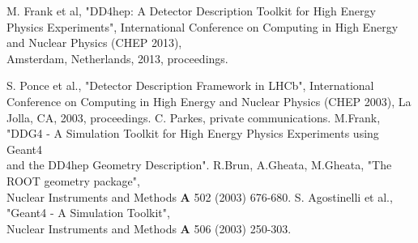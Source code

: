 \documentclass[10pt,a4paper]{article}
\begin{document}
\newpage
\begin{thebibliography}{9}
 M. Frank et al, "DD4hep: A Detector Description Toolkit 
                for High Energy Physics Experiments",
                International Conference on Computing in High Energy and Nuclear Physics  
                (CHEP 2013), \\
                Amsterdam, Netherlands, 2013, proceedings.

 S. Ponce et al., 
                "Detector Description Framework in LHCb", 
                International Conference on Computing in High Energy and Nuclear Physics  (CHEP 2003), 
                La Jolla, CA, 2003, proceedings. 
 C. Parkes, private communications.
 M.Frank, "DDG4 - A Simulation Toolkit for High Energy 
                Physics Experiments using Geant4 \\
                and the DD4hep Geometry Description".
 R.Brun, A.Gheata, M.Gheata, "The ROOT geometry package",\\
                    Nuclear Instruments and Methods {\bf{A}} 502 (2003) 676-680.
  S. Agostinelli et al., 
                   "Geant4 - A Simulation Toolkit", \\
                    Nuclear Instruments and Methods {\bf{A}} 506 (2003) 250-303.

\end{thebibliography}
\end{document}
